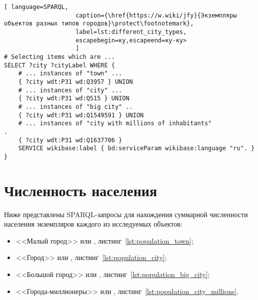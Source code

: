 \begin{lstlisting}[ language=SPARQL, 
                    caption={\href{https://w.wiki/jfy}{Экземпляры объектов разных типов городов}\protect\footnotemark},
                    label=lst:different_city_types, 
                    escapebegin=ку,escapeend=ку-ку>
                    ]
# Selecting items which are ...
SELECT ?city ?cityLabel WHERE {
	# ... instances of "town" ...                                    
	{ ?city wdt:P31 wd:Q3957 } UNION
	# ... instances of "city" ...                                
	{ ?city wdt:P31 wd:Q515 } UNION
	# ... instances of "big city" ..                                   
	{ ?city wdt:P31 wd:Q1549591 } UNION
	# ... instances of "city with millions of inhabitants"                              .
	{ ?city wdt:P31 wd:Q1637706 }                                     
	SERVICE wikibase:label { bd:serviceParam wikibase:language "ru". }
}
\end{lstlisting}


\section{Численность населения}

Ниже представлены SPARQL-запросы для нахождения суммарной численности населения экземпляров каждого из исследуемых объектов: 
\begin{itemize}
	\item <<Малый город>> или , листинг~\ref{lst:population_town};
	\item <<Город>> или , листинг~\ref{lst:population_city};
	\item <<Большой город>> или , листинг~\ref{lst:population_big_city};
	\item <<Города-миллионеры>> или , листинг~\ref{lst:population_city_millions}.
\end{itemize}


